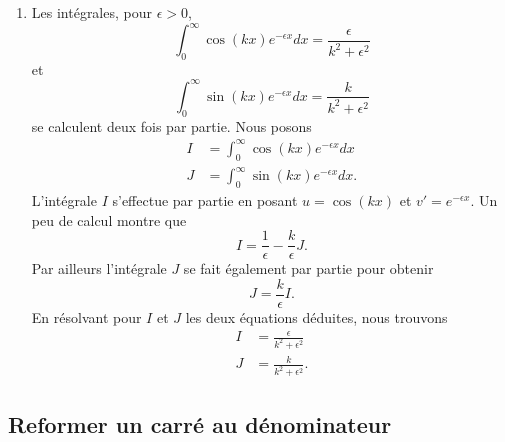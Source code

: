 \begin{enumerate}
	\item
	      Les intégrales, pour \( \epsilon>0\),
	      \begin{equation}        \label{EQooNCVIooWqbbrH}
		      \boxed{ \int_0^{\infty}\cos(kx) e^{-\epsilon x}dx=\frac{ \epsilon }{ k^2+\epsilon^2 } }
	      \end{equation}
	      et
	      \begin{equation}        \label{EQooSAYUooSatbGc}
		      \boxed{  \int_0^{\infty}\sin(kx) e^{-\epsilon x}dx=\frac{ k }{ k^2+\epsilon^2 }     }
	      \end{equation}
	      se calculent deux fois par partie. Nous posons
	      \begin{subequations}
		      \begin{align}
			      I & =\int_0^{\infty}\cos(kx) e^{-\epsilon x}dx  \\
			      J & =\int_0^{\infty}\sin(kx) e^{-\epsilon x}dx.
		      \end{align}
	      \end{subequations}
	      L'intégrale \( I\) s'effectue par partie en posant \( u=\cos(kx)\) et \( v'= e^{-\epsilon x}\). Un peu de calcul montre que
	      \begin{equation}
		      I=\frac{1}{ \epsilon }-\frac{ k }{ \epsilon }J.
	      \end{equation}
	      Par ailleurs l'intégrale \( J\) se fait également par partie pour obtenir
	      \begin{equation}
		      J=\frac{ k }{ \epsilon }I.
	      \end{equation}
	      En résolvant pour \( I\) et \( J\) les deux équations déduites, nous trouvons
	      \begin{subequations}
		      \begin{align}
			      I & =\frac{ \epsilon }{ k^2+\epsilon^2 } \\
			      J & =\frac{ k }{ k^2+\epsilon^2 }.
		      \end{align}
	      \end{subequations}
\end{enumerate}

\subsection{Reformer un carré au dénominateur}
\label{subsecCarreDenoPar}

